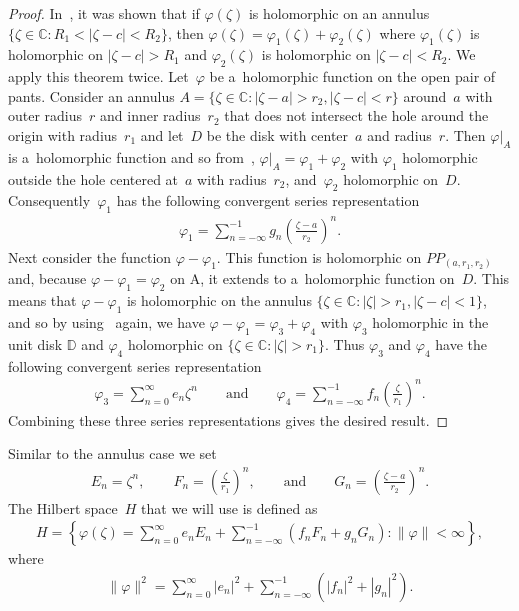 \documentclass[11pt]{article}
\numberwithin{equation}{section}
\begin{document}
\begin{proof}
In~\cite{Ahlfors}, it was shown that if $\varphi(\zeta)$ is holomorphic on an annulus $\{\zeta\in{\mathbb C}: R_1 <
|\zeta-c|<R_2\}$, then $\varphi(\zeta)=\varphi_1(\zeta)+\varphi_2(\zeta)$ where $\varphi_1(\zeta)$ is holomorphic on
$|\zeta-c|>R_1$ and $\varphi_2(\zeta)$ is holomorphic on $|\zeta-c|<R_2$.
We apply this theorem twice.
Let~$\varphi$ be a~holomorphic function on the open pair of pants.
Consider an annulus $A=\{\zeta\in{\mathbb C}: |\zeta-a|>r_2, |\zeta-c|<r\}$ around~$a$ with outer radius~$r$ and inner
radius~$r_2$ that does not intersect the hole around the origin with radius~$r_1$ and let~$D$ be the disk with
center~$a$ and radius~$r$.
Then $\varphi|_{A}$ is a~holomorphic function and so from~\cite{Ahlfors}, $\varphi|_{A}=\varphi_1+\varphi_2$ with
$\varphi_1$ holomorphic outside the hole centered at~$a$ with radius~$r_2$, and~$\varphi_2$ holomorphic on~$D$.
Consequently~$\varphi_1$ has the following convergent series representation
\begin{gather*}
\varphi_1=\sum\limits_{n=-\infty}^{-1} g_n\left(\frac{\zeta-a}{r_2}\right)^n.
\end{gather*}
Next consider the function $\varphi-\varphi_1$.
This function is holomorphic on $PP_{(a, r_1,r_2)}$ and, because $\varphi-\varphi_1=\varphi_2$ on A, it extends to
a~holomorphic function on~$D$.
This means that $\varphi-\varphi_1$ is holomorphic on the annulus $\{\zeta\in{\mathbb C}: |\zeta|>r_1, |\zeta-c|<1\}$,
and so by using~\cite{Ahlfors} again, we have $\varphi-\varphi_1=\varphi_3+\varphi_4$ with $\varphi_3$ holomorphic
in the unit disk ${\mathbb D}$ and $\varphi_4$ holomorphic on $\{\zeta\in{\mathbb C}: |\zeta|>r_1 \}$.
Thus $\varphi_3$ and $\varphi_4$ have the following convergent series representation
\begin{gather*}
\varphi_3=\sum\limits_{n=0}^\infty e_n \zeta^n
\qquad \text{and} \qquad
\varphi_4=\sum\limits_{n=-\infty}^{-1}f_n\left(\frac{\zeta}{r_1}\right)^n.
\end{gather*}
Combining these three series representations gives the desired result.
\end{proof}

Similar to the annulus case we set
\begin{gather*}
E_n=\zeta^n,
\qquad
F_n =\left(\frac{\zeta}{r_1}\right)^n,
\qquad \text{and} \qquad
G_n=\left(\frac{\zeta-a}{r_2}\right)^n.
\end{gather*}
The Hilbert space~$H$ that we will use is def\/ined as
\begin{gather}
\label{Hilbert_space}
H=\left\{\varphi(\zeta)=\sum\limits_{n=0}^\infty e_nE_n+\sum\limits_{n=-\infty}^{-1}(f_nF_n+g_nG_n):
\|\varphi\|<\infty\right\},
\end{gather}
where
\begin{gather*}
\|\varphi\|^2=\sum\limits_{n=0}^\infty |e_n|^2+\sum\limits_{n=-\infty}^{-1}\left(|f_n|^2+|g_n|^2\right).
\end{gather*}
\end{document}
